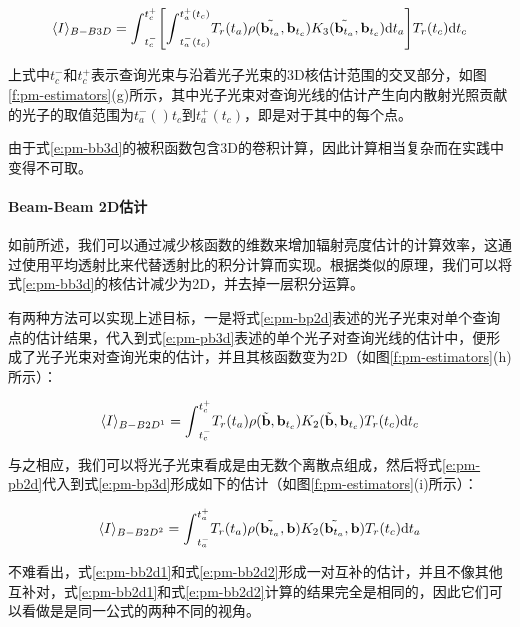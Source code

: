 \begin{equation}\label{e:pm-bb3d}
	\langle I\rangle_{B-B3D}={\rm \int}^{t^{+}_{c}}_{t^{-}_{c}}\Biggl[{\rm \int}^{t^{+}_{a}(t_c)}_{t^{-}_{a}(t_c)}T_r(t_a) \rho(\tilde{\mathbf{b}_{t_a}},\mathbf{b}_{t_c})K_3(\tilde{\mathbf{b}_{t_a}},\mathbf{b}_{t_c}){\rm d}t_a\Biggl]T_r(t_c){\rm d}t_c
\end{equation}

上式中$t^{-}_c$和$t^{+}_c$表示查询光束与沿着光子光束的3D核估计范围的交叉部分，如图\ref{f:pm-estimators}(g)所示，其中光子光束对查询光线的估计产生向内散射光照贡献的光子的取值范围为$t^{-}_a()t_c$到$t^{+}_a(t_c)$，即是对于其中的每个点。

由于式\ref{e:pm-bb3d}的被积函数包含3D的卷积计算，因此计算相当复杂而在实践中变得不可取。




\paragraph{Beam-Beam 2D估计}
如前所述，我们可以通过减少核函数的维数来增加辐射亮度估计的计算效率，这通过使用平均透射比来代替透射比的积分计算而实现。根据类似的原理，我们可以将式\ref{e:pm-bb3d}的核估计减少为2D，并去掉一层积分运算。

有两种方法可以实现上述目标，一是将式\ref{e:pm-bp2d}表述的光子光束对单个查询点的估计结果，代入到式\ref{e:pm-pb3d}表述的单个光子对查询光线的估计中，便形成了光子光束对查询光束的估计，并且其核函数变为2D（如图\ref{f:pm-estimators}(h)所示）：

\begin{equation}\label{e:pm-bb2d1}
	\langle I\rangle_{{B-B2D}^{1}}={\rm \int}^{t^{+}_{c}}_{t^{-}_{c}}T_r(t_a) \rho(\tilde{\mathbf{b}},\mathbf{b}_{t_c})K_2(\tilde{\mathbf{b}},\mathbf{b}_{t_c})T_r(t_c){\rm d}t_c
\end{equation}

与之相应，我们可以将光子光束看成是由无数个离散点组成，然后将式\ref{e:pm-pb2d}代入到式\ref{e:pm-bp3d}形成如下的估计（如图\ref{f:pm-estimators}(i)所示）：

\begin{equation}\label{e:pm-bb2d2}
	\langle I\rangle_{{B-B2D}^{2}}={\rm \int}^{t^{+}_{a}}_{t^{-}_{a}}T_r(t_a) \rho(\tilde{\mathbf{b}_{t_a}},\mathbf{b})K_2(\tilde{\mathbf{b}_{t_a}},\mathbf{b})T_r(t_c){\rm d}t_a
\end{equation}

不难看出，式\ref{e:pm-bb2d1}和式\ref{e:pm-bb2d2}形成一对互补的估计，并且不像其他互补对，式\ref{e:pm-bb2d1}和式\ref{e:pm-bb2d2}计算的结果完全是相同的，因此它们可以看做是是同一公式的两种不同的视角。

